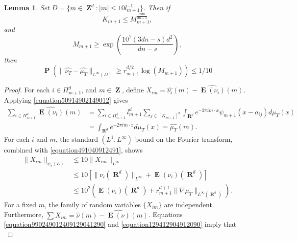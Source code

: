 \documentclass[12pt,reqno]{article}
\newtheorem{lemma}[theorem]{Lemma}
\DeclareMathOperator{\RR}{\mathbf{R}}
\DeclareMathOperator{\ZZ}{\mathbf{Z}}
\DeclareMathOperator{\EE}{\mathbf{E}}
\DeclareMathOperator{\PP}{\mathbf{P}}
\newcommand{\psitwo}[1]{\| {#1} \|_{\psi_2(L)}}
\begin{document}
\begin{lemma} \label{deviationLemma}
    Set $D = \{ m \in \ZZ^d: |m| \leq 10l_{m+1}^{-1} \}$. Then if
    \begin{equation} \label{equation109519029012}
        K_{m+1} \leq M_{m+1}^{\frac{2dn}{dn - s}},
    \end{equation}
    and
    \begin{equation} \label{equation1940129041}
        M_{m+1} \geq \exp \left( \frac{10^7 (3dn - s) d^2}{dn - s} \right),
    \end{equation}
    then
    \[ \PP \left( \| \widehat{\nu_T} - \widehat{\mu_T} \|_{L^\infty(D)} \geq r_{m+1}^{d/2} \log(M_{m+1}) \right) \leq 1/10 \]
\end{lemma}
\begin{proof}
    For each $i \in \Pi_{m+1}^d$, and $m \in \ZZ$, define $X_{im} = \widehat{\nu_i}(m) - \widehat{\EE(\nu_i)}(m)$. Applying \eqref{equation50914902149012} gives 
    \begin{equation} \label{equation891248921894128942189}
    \begin{split}
        \sum_{i \in \Pi_{m+1}^d} \widehat{\EE(\nu_i)}(m) &= \sum_{i \in \Pi_{m+1}^d} l_{m+1}^d \sum_{j \in [K_{m+1}]^d} \int_{\RR^d} e^{- 2 \pi i m \cdot x} \psi_{m+1}(x - a_{ij}) d\mu_T(x)\\
        &= \int_{\RR^d} e^{-2 \pi i m \cdot x} d\mu_T(x) = \widehat{\mu_T}(m).
    \end{split}
    \end{equation}
    For each $i$ and $m$, the standard $(L^1,L^\infty)$ bound on the Fourier transform, combined with \eqref{equation491040912491}, shows
    \begin{equation} \label{equation12904912049012}
    \begin{split}
        \psitwo{X_{im}} &\leq 10 \| X_{im} \|_{L^\infty}\\
        &\leq 10[\| \nu_i(\RR^d) \|_{L^\infty} + \EE(\nu_i)(\RR^d)]\\
        &\leq 10^2 \left( \EE(\nu_i)(\RR^d) + r_{m+1}^{d+1} \| \nabla \mu_T \|_{L^\infty(\RR^d)} \right).
    \end{split}
    \end{equation}
    For a fixed $m$, the family of random variables $\{ X_{im} \}$ are independent. Furthermore, $\sum X_{im} = \widehat{\nu}(m) - \widehat{\EE(\nu)}(m)$. Equations \eqref{equation990249012409129041290} and \eqref{equation129412904912090} imply that
    \begin{equation} \label{equation19241902490129021}

\end{equation}
\end{proof}
\end{document}
